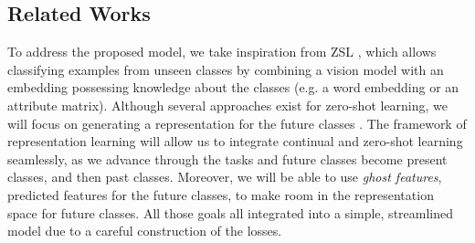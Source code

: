 \subsection{Related Works}
\label{sec:ghost_related}

To address the proposed model, we take inspiration from \acf{ZSL}
\citep{lampert2009zeroshot,xian2019awa2}, which allows classifying examples from unseen classes by
combining a vision model with an embedding possessing knowledge about the classes (e.g. a word
embedding \citep{mikolov2013word2vec,pennington2014glove} or an attribute matrix). Although several
approaches exist for zero-shot learning, we will focus on generating a representation for the future
classes \citep{bucher2017zeroshot_gmmn, kumar2018synthesized_zeroshot,
    xian2018feature_generating_zeroshot}. The framework of representation learning will allow us to
integrate continual and zero-shot learning seamlessly, as we advance through the tasks and future
classes become present classes, and then past classes. Moreover, we will be able to use
\textit{ghost features}, predicted features for the future classes, to make room in the
representation space for future classes. All those goals all integrated into a simple, streamlined
model due to a careful construction of the losses.

